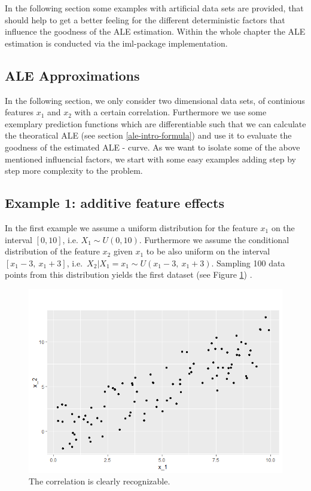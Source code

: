 \documentclass[
]{krantz}
\begin{document}
In the following section some examples with artificial data sets are provided, that should help to get a better feeling for the different deterministic factors that influence the goodness of the ALE estimation. Within the whole chapter the ALE estimation is conducted via the iml-package implementation.

\hypertarget{ale-approximations}{%
\subsection{ALE Approximations}\label{ale-approximations}}

In the following section, we only consider two dimensional data sets, of continious features \(x_1\) and \(x_2\) with a certain correlation. Furthermore we use some exemplary prediction functions which are differentiable such that we can calculate the theoratical ALE (see section \ref{ale-intro-formula}) and use it to evaluate the goodness of the estimated ALE - curve. As we want to isolate some of the above mentioned influencial factors, we start with some easy examples adding step by step more complexity to the problem.

\hypertarget{example-1-additive-feature-effects}{%
\subsection{Example 1: additive feature effects}\label{example-1-additive-feature-effects}}

In the first example we assume a uniform distribution for the feature \(x_1\) on the interval \([0, 10]\), i.e.
\(X_1 \sim U(0,10)\). Furthermore we assume the conditional distribution of the feature \(x_2\) given \(x_1\) to be also uniform on the interval \([x_1 - 3,~x_1 + 3 ]\), i.e.~\(X_2 \vert X_1 = x_1 \sim U(x_1 - 3,~x_1 + 3 )\). Sampling 100 data points from this distribution yields the first dataset (see Figure \ref{fig:DatasetALE1}) .

\begin{figure}
\includegraphics[width=1\linewidth]{images/ALE_2_Dataset1_} \caption{The correlation is clearly recognizable.}\label{fig:DatasetALE1}
\end{figure}
\end{document}
